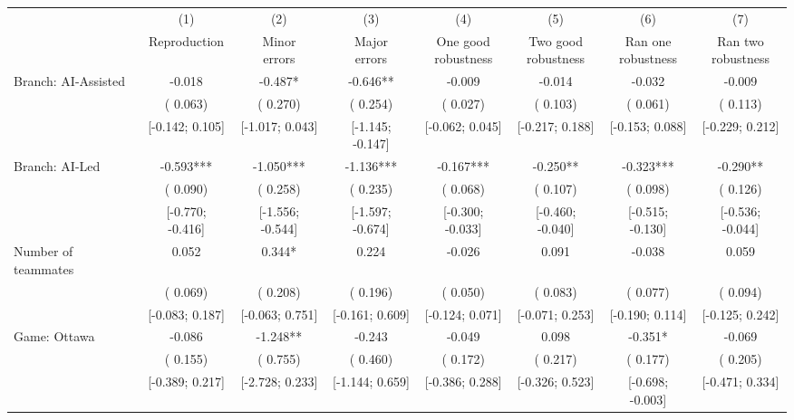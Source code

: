 \def\sym#1{\ifmmode^{#1}\else\(^{#1}\)\fi}
\begin{tabular}{l*{7}{c}}
\hline\hline
& (1) & (2) & (3) & (4) & (5) & (6) & (7)\\
                    &Reproduction   &\shortstack[c]{Minor\\errors}   &\shortstack[c]{Major\\errors}   &\shortstack[c]{One good\\robustness}   &\shortstack[c]{Two good\\robustness}   &\shortstack[c]{Ran one\\robustness}   &\shortstack[c]{Ran two\\robustness}     \\
\hline
Branch: AI-Assisted & -0.018 & -0.487* & -0.646** & -0.009 & -0.014 & -0.032 & -0.009 \\
                    & ( 0.063) & ( 0.270) & ( 0.254) & ( 0.027) & ( 0.103) & ( 0.061) & ( 0.113) \\
                    & [-0.142;  0.105] & [-1.017;  0.043] & [-1.145; -0.147] & [-0.062;  0.045] & [-0.217;  0.188] & [-0.153;  0.088] & [-0.229;  0.212] \\
Branch: AI-Led & -0.593*** & -1.050*** & -1.136*** & -0.167*** & -0.250** & -0.323*** & -0.290** \\
                    & ( 0.090) & ( 0.258) & ( 0.235) & ( 0.068) & ( 0.107) & ( 0.098) & ( 0.126) \\
                    & [-0.770; -0.416] & [-1.556; -0.544] & [-1.597; -0.674] & [-0.300; -0.033] & [-0.460; -0.040] & [-0.515; -0.130] & [-0.536; -0.044] \\
Number of teammates &  0.052 &  0.344* &  0.224 & -0.026 &  0.091 & -0.038 &  0.059 \\
                    & ( 0.069) & ( 0.208) & ( 0.196) & ( 0.050) & ( 0.083) & ( 0.077) & ( 0.094) \\
                    & [-0.083;  0.187] & [-0.063;  0.751] & [-0.161;  0.609] & [-0.124;  0.071] & [-0.071;  0.253] & [-0.190;  0.114] & [-0.125;  0.242] \\
Game: Ottawa & -0.086 & -1.248** & -0.243 & -0.049 &  0.098 & -0.351* & -0.069 \\
                    & ( 0.155) & ( 0.755) & ( 0.460) & ( 0.172) & ( 0.217) & ( 0.177) & ( 0.205) \\
                    & [-0.389;  0.217] & [-2.728;  0.233] & [-1.144;  0.659] & [-0.386;  0.288] & [-0.326;  0.523] & [-0.698; -0.003] & [-0.471;  0.334] \\

\end{tabular}
